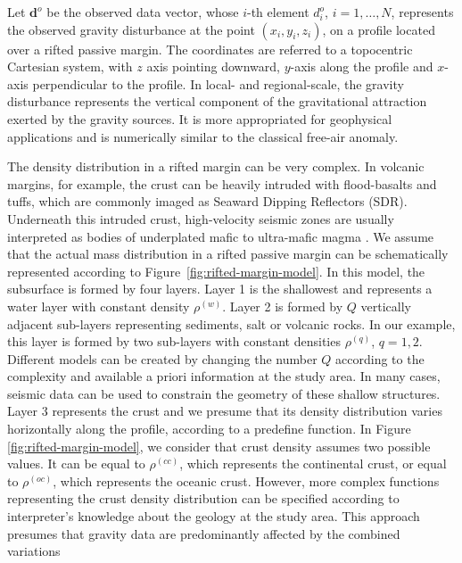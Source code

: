 \documentclass[manuscript]{geophysics}
\begin{document}
Let $\mathbf{d}^{o}$ be the observed data vector, whose $i$-th element $d^{o}_{i}$, 
$i = 1, \dots, N$, represents the observed gravity disturbance at the point 
$(x_{i}, y_{i}, z_{i})$, on a profile located over a rifted passive margin. The
coordinates are referred to a topocentric Cartesian system, with $z$ axis pointing
downward, $y$-axis along the profile and $x$-axis perpendicular to the profile. 
In local- and regional-scale, the gravity disturbance \citep{heiskanen-moritz1967} 
represents the vertical component of the gravitational attraction exerted by the gravity 
sources. It is more appropriated for geophysical applications 
\citep{li2001, fairhead2003, hackney-featherstone2003, hinze2005, vajda-etal2006, vajda-etal2007}
and is numerically similar to the classical free-air anomaly.

The density distribution in a rifted margin can be very complex.
In volcanic margins, for example, the crust can be heavily intruded with
flood-basalts and tuffs, which are commonly imaged as Seaward Dipping Reflectors (SDR).
Underneath this intruded crust, high-velocity seismic zones are usually interpreted 
as bodies of underplated mafic to ultra-mafic magma \citep{geoffroy2005}.
We assume that the actual mass distribution in a rifted passive margin can be 
schematically represented according to Figure~\ref{fig:rifted-margin-model}. 
In this model, the subsurface is formed by four layers. 
Layer 1 is the shallowest and represents a water layer with constant density
$\rho^{(w)}$. 
Layer 2 is formed by $Q$ vertically adjacent sub-layers representing 
sediments, salt or volcanic rocks.
In our example, this layer is formed by two sub-layers with constant densities
$\rho^{(q)}$, $q = 1, 2$. Different models can be created by changing the number $Q$
according to the complexity and available a priori information at the
study area.
In many cases, seismic data can be used to constrain the geometry of these 
shallow structures.
Layer 3 represents the crust and we presume that its density distribution 
varies horizontally along the profile, according to a predefine function.
In Figure \ref{fig:rifted-margin-model}, we consider that crust density assumes two possible values. 
It can be equal to $\rho^{(cc)}$, which
represents the continental crust, or equal to $\rho^{(oc)}$, which represents the
oceanic crust.
However, more complex functions representing the crust density distribution can be
specified according to interpreter's knowledge about the geology at the study area.
This approach presumes that gravity data are predominantly affected by the combined variations 
\end{document}
